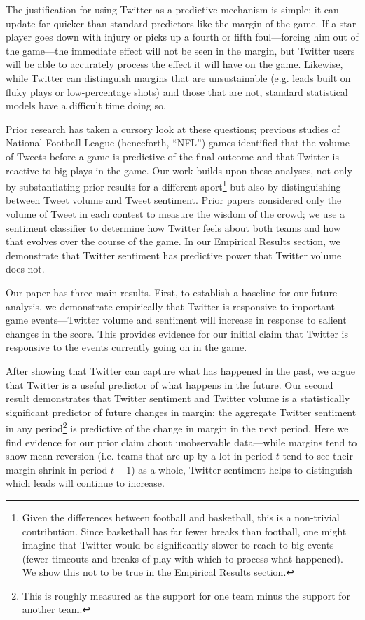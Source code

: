 \documentclass[12pt]{article}
\begin{document}
\begin{doublespacing}
The justification for using Twitter as a predictive mechanism is simple: it can update far quicker than standard predictors like the margin of the game. If a star player goes down with injury or picks up a fourth or fifth foul---forcing him out of the game---the immediate effect will not be seen in the margin, but Twitter users will be able to accurately process the effect it will have on the game. Likewise, while Twitter can distinguish margins that are unsustainable (e.g. leads built on fluky plays or low-percentage shots) and those that are not, standard statistical models have a difficult time doing so. 

Prior research has taken a cursory look at these questions; previous studies of National Football League (henceforth, ``NFL'') games identified that the volume of Tweets before a game is predictive of the final outcome and that Twitter is reactive to big plays in the game. Our work builds upon these analyses, not only by substantiating prior results for a different sport\footnote{Given the differences between football and basketball, this is a non-trivial contribution. Since basketball has far fewer breaks than football, one might imagine that Twitter would be significantly slower to reach to big events (fewer timeouts and breaks of play with which to process what happened). We show this not to be true in the Empirical Results section.} but also by distinguishing between Tweet volume and Tweet sentiment. Prior papers considered only the volume of Tweet in each contest to measure the wisdom of the crowd; we use a sentiment classifier to determine how Twitter feels about both teams and how that evolves over the course of the game. In our Empirical Results section, we demonstrate that Twitter sentiment has predictive power that Twitter volume does not.  

Our paper has three main results. First, to establish a baseline for our future analysis, we demonstrate empirically that Twitter is responsive to important game events---Twitter volume and sentiment will increase in response to salient changes in the score. This provides evidence for our initial claim that Twitter is responsive to the events currently going on in the game.  

After showing that Twitter can capture what has happened in the past, we argue that Twitter is a useful predictor of what happens in the future. Our second result demonstrates that Twitter sentiment and Twitter volume is a statistically significant predictor of future changes in margin; the aggregate Twitter sentiment in any period\footnote{This is roughly measured as the support for one team minus the support for another team.} is predictive of the change in margin in the next period. Here we find evidence for our prior claim about unobservable data---while margins tend to show mean reversion (i.e. teams that are up by a lot in period $t$ tend to see their margin shrink in period $t+1$) as a whole, Twitter sentiment helps to distinguish which leads will continue to increase. 


\end{doublespacing}
\end{document}

